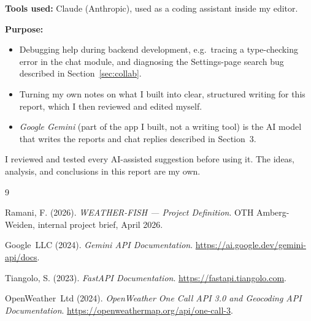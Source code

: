 \documentclass[11pt, a4paper]{article}
\begin{document}
\noindent\textbf{Tools used:} Claude (Anthropic), used as a coding assistant inside my
editor.

\medskip
\noindent\textbf{Purpose:}
\begin{itemize}[noitemsep]
  \item Debugging help during backend development, e.g.\ tracing a type-checking error in
        the chat module, and diagnosing the Settings-page search bug described in
        Section~\ref{sec:collab}.
  \item Turning my own notes on what I built into clear, structured writing for this
        report, which I then reviewed and edited myself.
  \item \textit{Google Gemini} (part of the app I built, not a writing tool) is the AI
        model that writes the reports and chat replies described in Section~3.
\end{itemize}

\noindent I reviewed and tested every AI-assisted suggestion before using it. The ideas,
analysis, and conclusions in this report are my own.


\begin{thebibliography}{9}

Ramani, F. (2026).
\newblock \textit{WEATHER-FISH — Project Definition}.
\newblock OTH Amberg-Weiden, internal project brief, April 2026.

Google~LLC (2024).
\newblock \textit{Gemini API Documentation}.
\newblock \url{https://ai.google.dev/gemini-api/docs}.

Tiangolo, S. (2023).
\newblock \textit{FastAPI Documentation}.
\newblock \url{https://fastapi.tiangolo.com}.

OpenWeather~Ltd (2024).
\newblock \textit{OpenWeather One Call API 3.0 and Geocoding API Documentation}.
\newblock \url{https://openweathermap.org/api/one-call-3}.

\end{thebibliography}
\end{document}
